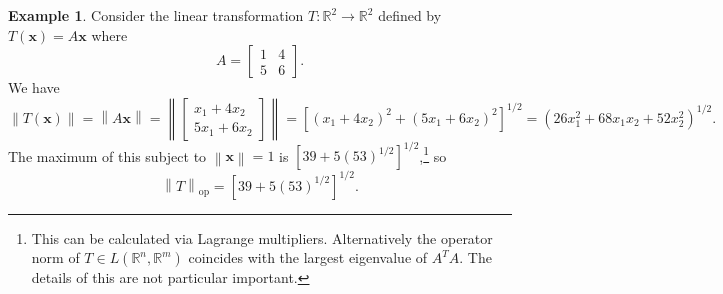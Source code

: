 \documentclass{article}
\newcommand{\R}{\mathbb{R}}
\newcommand{\x}{\mathbf{x}}
\newcommand{\norm}[1]{\left\lVert#1\right\rVert}
\theoremstyle{definition}
\newtheorem{example}{Example}[section]
\begin{document}
	
	\begin{example}
		Consider the linear transformation $ T:\R^2\to\R^2 $ defined by $ T(\x)=A\x $ where $$ A = \begin{bmatrix}
			1 & 4\\ 5 & 6
		\end{bmatrix}. $$
		We have 
		$$\norm{T(\x)}=\norm{A\x}=\norm{\begin{bmatrix}
				x_1 + 4x_2\\ 5x_1 + 6x_2
		\end{bmatrix}} = \left[(x_1 + 4x_2)^2 + (5x_1 + 6x_2)^2\right]^{1/2} = \left(26x_1^2 + 68 x_1x_2 + 52x_2^2\right)^{1/2}. $$ The maximum of this subject to $ \norm{\x} = 1 $ is $ \left[39+5(53)^{1/2}\right]^{1/2}$,\footnote{This can be calculated via Lagrange multipliers. Alternatively the operator norm of $ T\in L(\R^n,\R^m) $ coincides with the largest eigenvalue of $ A^TA $. The details of this are not particular important.} so $$ \norm{T}_\text{op}= \left[39+5(53)^{1/2}\right]^{1/2}.$$ 
	\end{example}
	
\end{document}

